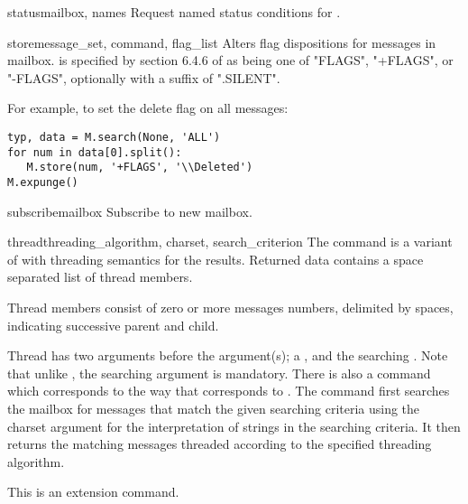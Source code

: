 \begin{methoddesc}[IMAP4]{status}{mailbox, names}
  Request named status conditions for . 
\end{methoddesc}

\begin{methoddesc}[IMAP4]{store}{message_set, command, flag_list}
  Alters flag dispositions for messages in mailbox.   is
  specified by section 6.4.6 of  as being one of "FLAGS", "+FLAGS",
  or "-FLAGS", optionally with a suffix of ".SILENT".

  For example, to set the delete flag on all messages:

\begin{verbatim}
typ, data = M.search(None, 'ALL')
for num in data[0].split():
   M.store(num, '+FLAGS', '\\Deleted')
M.expunge()
\end{verbatim}
\end{methoddesc}

\begin{methoddesc}[IMAP4]{subscribe}{mailbox}
  Subscribe to new mailbox.
\end{methoddesc}

\begin{methoddesc}[IMAP4]{thread}{threading_algorithm, charset,
                           search_criterion}
  The  command is a variant of  with
  threading semantics for the results.  Returned data contains a space
  separated list of thread members.

  Thread members consist of zero or more messages numbers, delimited
  by spaces, indicating successive parent and child.

  Thread has two arguments before the 
  argument(s); a , and the searching
  .  Note that unlike , the searching
   argument is mandatory.  There is also a  command which corresponds to  the way that
   corresponds to .  The 
  command first searches the mailbox for messages that match the given
  searching criteria using the charset argument for the interpretation
  of strings in the searching criteria. It then returns the matching
  messages threaded according to the specified threading algorithm.

  This is an  extension command. 
\end{methoddesc}

